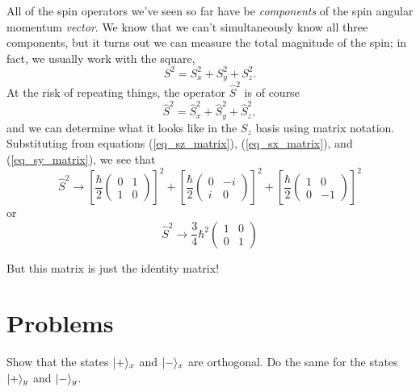 All of the spin operators we've seen so far have be \emph{components} of the spin angular momentum \emph{vector}.  We know that we can't simultaneously know all three components, but it turns out we can measure the total magnitude of the spin; in fact, we usually work with the square,
\begin{equation}
S^2 = S_x^2 + S_y^2 + S_z^2.
\end{equation}
At the risk of repeating things, the operator $\hat{S}^2$ is of course
\begin{equation}
\hat{S}^2 = \hat{S}_x^2 + \hat{S}_y^2 + \hat{S}_z^2,
\end{equation}
and we can determine what it looks like in the $S_z$ basis using matrix notation.  Substituting from equations (\ref{eq_sz_matrix}), (\ref{eq_sx_matrix}), and (\ref{eq_sy_matrix}), we see that
\begin{equation}
\hat{S}^2 \to \left[ \frac{\hbar}{2} \begin{pmatrix} 0 & 1 \\ 1 & 0 \end{pmatrix} \right]^2 + 
\left[ \frac{\hbar}{2} \begin{pmatrix} 0 & -i \\ i & 0 \end{pmatrix} \right]^2 + 
\left[ \frac{\hbar}{2} \begin{pmatrix} 1 & 0 \\ 0 & -1 \end{pmatrix} \right]^2
\end{equation}
or
\begin{equation}
\hat{S}^2 \to \frac{3}{4} \hbar^2 \begin{pmatrix} 1 & 0 \\ 0 & 1 \end{pmatrix} 
\end{equation}

But this matrix is just the identity matrix!

\section*{Problems}
%

\begin{problem}[Orthogonality]
Show that the states $| + \rangle_x$ and $| - \rangle_x$ are orthogonal.  Do the same for the states $| + \rangle_y$ and $| - \rangle_y$. 
\end{problem}


